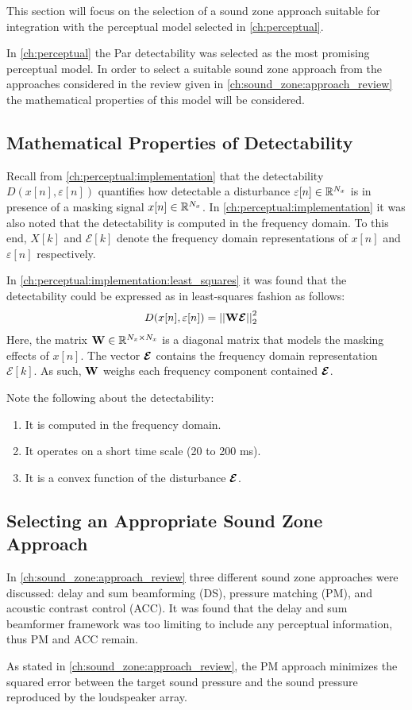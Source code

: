 This section will focus on the selection of a sound zone approach suitable for integration with the perceptual model selected in \autoref{ch:perceptual}.

In \autoref{ch:perceptual} the Par detectability was selected as the most promising perceptual model.
In order to select a suitable sound zone approach from the approaches considered in the review given in \autoref{ch:sound_zone:approach_review} the 
mathematical properties of this model will be considered.

\subsection{Mathematical Properties of Detectability}
Recall from \autoref{ch:perceptual:implementation} that the detectability $D(x[n],\varepsilon[n])$ quantifies how detectable a disturbance
$\varepsilon[n]\in\mathbb{R}^{N_x}$ is in presence of a masking signal $x[n]\in\mathbb{R}^{N_x}$.
In \autoref{ch:perceptual:implementation} it was also noted that the detectability is computed in the frequency domain.
To this end, $X[k]$ and $\mathcal{E}[k]$ denote the frequency domain representations of $x[n]$ and $\varepsilon[n]$ respectively.

In \autoref{ch:perceptual:implementation:least_squares} it was found that the detectability could be expressed as in least-squares fashion as follows:
\begin{align}
    D(x[n],\varepsilon[n]) &= \norm[2][2]{\mat{W}\vecsymbol{\mathcal{E}}} 
\end{align}
Here, the matrix $\mathbf{W}\in\mathbb{R}^{N_x \times N_x}$ is a diagonal matrix that models the masking effects of $x[n]$.
The vector $\boldsymbol{\mathcal{E}}$ contains the frequency domain representation $\mathcal{E}[k]$.
As such, $\mathbf{W}$ weighs each frequency component contained $\boldsymbol{\mathcal{E}}$.

Note the following about the detectability:
\begin{enumerate}
    \item It is computed in the frequency domain. 
    \item It operates on a short time scale (20 to 200 ms).
    \item It is a convex function of the disturbance $\boldsymbol{\mathcal{E}}$.
\end{enumerate}

\subsection{Selecting an Appropriate Sound Zone Approach}
In \autoref{ch:sound_zone:approach_review} three different sound zone approaches were discussed: delay and sum beamforming (DS), pressure matching (PM),
and acoustic contrast control (ACC).
It was found that the delay and sum beamformer framework was too limiting to include any perceptual information, thus PM and ACC remain.

As stated in \autoref{ch:sound_zone:approach_review}, the PM approach minimizes the squared error between the target sound pressure and the 
sound pressure reproduced by the loudspeaker array.

